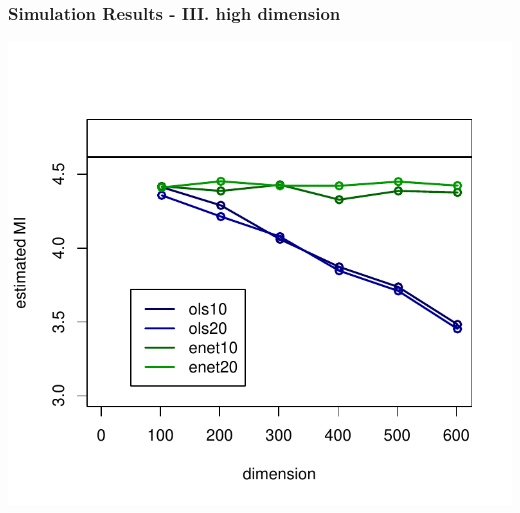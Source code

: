 \documentclass{beamer}
\begin{document}
\begin{frame}
\frametitle{Simulation Results - III. high dimension}
\begin{center}
\includegraphics[scale = 0.65]{../idloss/sim2a_fig3.pdf}
\end{center}
\end{frame}
\end{document}

